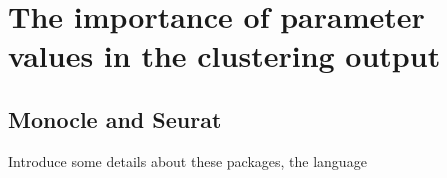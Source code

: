 \chapter{The importance of parameter values in the clustering output}

\section{Monocle and Seurat}
Introduce some details about these packages, the language 